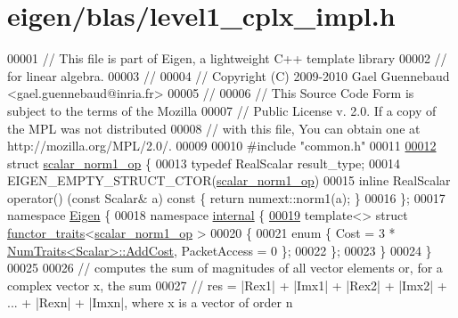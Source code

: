 \hypertarget{eigen_2blas_2level1__cplx__impl_8h_source}{}\section{eigen/blas/level1\+\_\+cplx\+\_\+impl.h}
\label{eigen_2blas_2level1__cplx__impl_8h_source}

\begin{DoxyCode}
00001 \textcolor{comment}{// This file is part of Eigen, a lightweight C++ template library}
00002 \textcolor{comment}{// for linear algebra.}
00003 \textcolor{comment}{//}
00004 \textcolor{comment}{// Copyright (C) 2009-2010 Gael Guennebaud <gael.guennebaud@inria.fr>}
00005 \textcolor{comment}{//}
00006 \textcolor{comment}{// This Source Code Form is subject to the terms of the Mozilla}
00007 \textcolor{comment}{// Public License v. 2.0. If a copy of the MPL was not distributed}
00008 \textcolor{comment}{// with this file, You can obtain one at http://mozilla.org/MPL/2.0/.}
00009 
00010 \textcolor{preprocessor}{#include "common.h"}
00011 
\hyperlink{structscalar__norm1__op}{00012} \textcolor{keyword}{struct }\hyperlink{structscalar__norm1__op}{scalar\_norm1\_op} \{
00013   \textcolor{keyword}{typedef} RealScalar result\_type;
00014   EIGEN\_EMPTY\_STRUCT\_CTOR(\hyperlink{structscalar__norm1__op}{scalar\_norm1\_op})
00015   \textcolor{keyword}{inline} RealScalar operator() (\textcolor{keyword}{const} Scalar& a)\textcolor{keyword}{ const }\{ \textcolor{keywordflow}{return} numext::norm1(a); \}
00016 \};
00017 \textcolor{keyword}{namespace }\hyperlink{namespace_eigen}{Eigen} \{
00018   \textcolor{keyword}{namespace }\hyperlink{namespaceinternal}{internal} \{
\hyperlink{struct_eigen_1_1internal_1_1functor__traits_3_01scalar__norm1__op_01_4}{00019}     \textcolor{keyword}{template}<> \textcolor{keyword}{struct }\hyperlink{struct_eigen_1_1internal_1_1functor__traits}{functor\_traits}<\hyperlink{structscalar__norm1__op}{scalar\_norm1\_op} >
00020     \{
00021       \textcolor{keyword}{enum} \{ Cost = 3 * \hyperlink{group___core___module_struct_eigen_1_1_num_traits}{NumTraits<Scalar>::AddCost}, PacketAccess = 0 \};
00022     \};
00023   \}
00024 \}
00025 
00026 \textcolor{comment}{// computes the sum of magnitudes of all vector elements or, for a complex vector x, the sum}
00027 \textcolor{comment}{// res = |Rex1| + |Imx1| + |Rex2| + |Imx2| + ... + |Rexn| + |Imxn|, where x is a vector of order n}

\end{DoxyCode}
